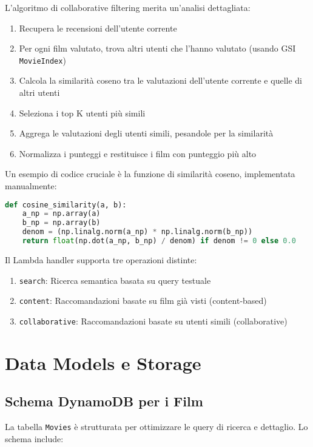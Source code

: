 \documentclass[11pt,a4paper]{article}
\begin{document}
L'algoritmo di collaborative filtering merita un'analisi dettagliata:

\begin{enumerate}
  \item Recupera le recensioni dell'utente corrente
  \item Per ogni film valutato, trova altri utenti che l'hanno valutato (usando GSI \texttt{MovieIndex})
  \item Calcola la similarità coseno tra le valutazioni dell'utente corrente e quelle di altri utenti
  \item Seleziona i top K utenti più simili
  \item Aggrega le valutazioni degli utenti simili, pesandole per la similarità
  \item Normalizza i punteggi e restituisce i film con punteggio più alto
\end{enumerate}

Un esempio di codice cruciale è la funzione di similarità coseno, implementata manualmente:

\begin{lstlisting}[language=Python]
def cosine_similarity(a, b):
    a_np = np.array(a)
    b_np = np.array(b)
    denom = (np.linalg.norm(a_np) * np.linalg.norm(b_np))
    return float(np.dot(a_np, b_np) / denom) if denom != 0 else 0.0
\end{lstlisting}

Il Lambda handler supporta tre operazioni distinte:

\begin{enumerate}
  \item \texttt{search}: Ricerca semantica basata su query testuale
  \item \texttt{content}: Raccomandazioni basate su film già visti (content-based)
  \item \texttt{collaborative}: Raccomandazioni basate su utenti simili (collaborative)
\end{enumerate}

\section{Data Models e Storage}
\subsection{Schema DynamoDB per i Film}
La tabella \texttt{Movies} è strutturata per ottimizzare le query di ricerca e dettaglio. Lo schema include:
\end{document}

